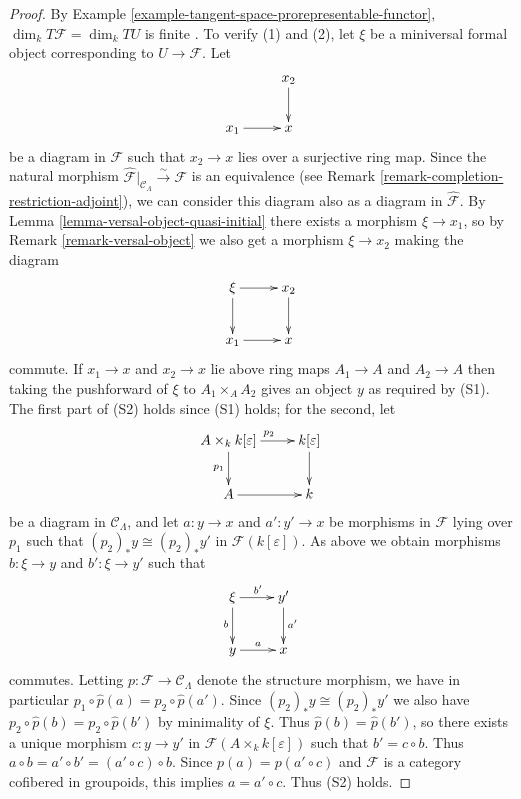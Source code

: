 \begin{proof}
By Example \ref{example-tangent-space-prorepresentable-functor}, $\dim_{k} 
T\mathcal F = \dim_{k} TU$ is finite . To verify (1) and (2), let $\xi$ be a 
miniversal formal object corresponding to $U \rightarrow \mathcal F$. Let 
\[
\xymatrix{
           & x_2 \ar[d] \\
x_1 \ar[r] & x   
}
\]
be a diagram in $\mathcal F$ such that $x_2 \rightarrow x$ lies over a 
surjective ring map. Since the natural morphism $\widehat{\mathcal 
F}|_{\mathcal C_{\Lambda}} \xrightarrow{\sim} \mathcal F$ is an equivalence 
(see Remark \ref{remark-completion-restriction-adjoint}), we can consider this 
diagram also as a diagram in $\widehat{\mathcal F}$.  By Lemma 
\ref{lemma-versal-object-quasi-initial} there exists a morphism $\xi 
\rightarrow x_1$, so by Remark \ref{remark-versal-object} we also get a 
morphism $\xi \rightarrow x_2$ making the diagram
\[
\xymatrix{
\xi \ar[r] \ar[d]          & x_2 \ar[d] \\
x_1 \ar[r] & x   
}
\]
commute.  If $x_1 \rightarrow x$ and $x_2 \rightarrow x$ lie above ring maps 
$A_1 \rightarrow A$ and $A_2 \rightarrow A$ then taking the pushforward of 
$\xi$ to $A_1 \times_{A} A_2$ gives an object $y$ as required by (S1). The 
first part of (S2) holds since (S1) holds; for the second, let \[
\xymatrix{
A \times_{k} k[\varepsilon]  \ar[r]^{p_2} \ar[d]_{p_1}  & k[\varepsilon] \ar[d] 
\\
A  \ar[r] & k 
}
\]  
be a diagram in $\mathcal C_{\Lambda}$, and let $a: y \rightarrow x$ and $a': 
y' \rightarrow x$ be morphisms in $\mathcal F$ lying over $p_{1}$ such that 
$(p_2)_{*}y \cong (p_2)_{*}y'$ in $\mathcal F(k[\varepsilon])$.  As above we 
obtain morphisms $b: \xi \rightarrow y$ and $b': \xi \rightarrow y'$ such that
\[
\xymatrix{
\xi \ar[r]^{b'} \ar[d]_{b}          & y' \ar[d]^{a'} \\
y \ar[r]^{a} & x   
}
\]
commutes.  Letting $p: \mathcal F \rightarrow \mathcal C_{\Lambda}$ denote the 
structure morphism, we have in particular $p_1 \circ \widehat{p}(a) = p_2 \circ 
\widehat{p}(a')$.  Since $(p_2)_{*}y \cong (p_2)_{*}y'$ we also have $p_2 \circ 
\widehat{p}(b) = p_2 \circ \widehat{p}(b')$ by minimality of $\xi$.  Thus 
$\widehat{p}(b) = \widehat{p}(b')$, so there exists a unique morphism $c: y 
\rightarrow y'$ in $\mathcal F(A \times_{k} k[\varepsilon])$ such that $b' = c 
\circ b$.  Thus $a \circ b = a' \circ b' = (a' \circ c) \circ b$.  Since $p(a) 
= p(a' \circ c)$ and $\mathcal F$ is a category cofibered in groupoids, this 
implies $a = a' \circ c$.  Thus (S2) holds.
\end{proof}

